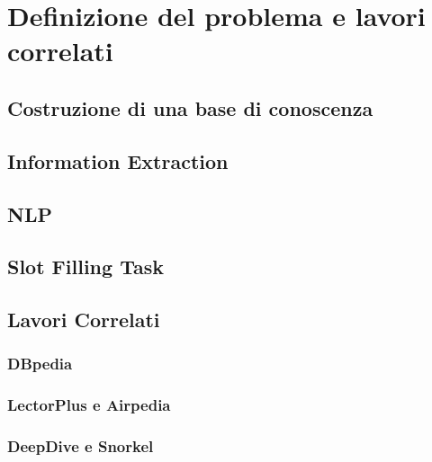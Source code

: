%
\chapter{Definizione del problema e lavori correlati}
\label{sec:literature_review}


\section{Costruzione di una base di conoscenza}
\label{sec:literature_review:costruzione_basi_conoscenza}

\section{Information Extraction}
\label{sec:literature_review:information_extraction}

\cite{Palomares2016WikipediaKG}

\section{NLP}
\label{sec:literature_review:nlp}


\section{Slot Filling Task}
\label{sec:literature_review:slot_filling_task}


\section{Lavori Correlati}
\label{sec:literature_review:lavori_correlati}

\subsection{DBpedia}
\label{sec:literature_review:dbpedia}

\subsection{LectorPlus e Airpedia}
\label{sec:literature_review:lectorplus_airpedia}

\subsection{DeepDive e Snorkel}
\label{sec:literature_review:deepdive_snorkel}




